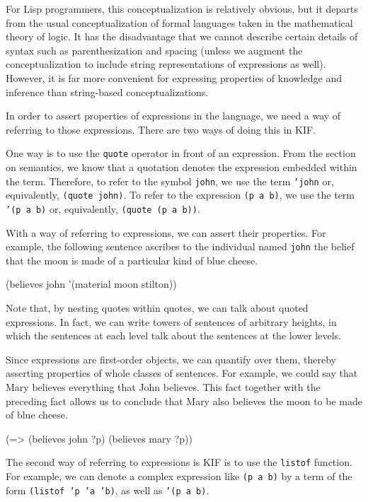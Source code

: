 For Lisp programmers, this conceptualization is relatively obvious, but it
departs from the usual conceptualization of formal languages taken in the
mathematical theory of logic.  It has the disadvantage that we cannot describe
certain details of syntax such as parenthesization and spacing (unless we
augment the conceptualization to include string representations of expressions
as well).  However, it is far more convenient for expressing properties of
knowledge and inference than string-based conceptualizations.

In order to assert properties of expressions in the language, we need a way of
referring to those expressions.  There are two ways of doing this in KIF.

One way is to use the {\tt quote} operator in front of an expression.  From the
section on semantics, we know that a quotation denotes the expression embedded
within the term.  Therefore, to refer to the symbol {\tt john}, we use the term
{\tt 'john} or, equivalently, {\tt (quote john)}.  To refer to the expression
{\tt (p a b)}, we use the term {\tt '(p a b)} or, equivalently, {\tt (quote (p a
b))}.

With a way of referring to expressions, we can assert their properties.  For
example, the following sentence ascribes to the individual named {\tt john} the
belief that the moon is made of a particular kind of blue cheese.

\medskip
\beginverbatim
(believes john '(material moon stilton))
\endverbatim
\medskip

Note that, by nesting quotes within quotes, we can talk about quoted
expressions.  In fact, we can write towers of sentences of arbitrary heights, in
which the sentences at each level talk about the sentences at the lower levels.

Since expressions are first-order objects, we can quantify over them, thereby
asserting properties of whole classes of sentences.  For example, we could say
that Mary believes everything that John believes.  This fact together with the
preceding fact allows us to conclude that Mary also believes the moon to be made
of blue cheese.

\medskip
\beginverbatim
(=> (believes john ?p) (believes mary ?p))
\endverbatim
\medskip

The second way of referring to expressions is KIF is to use the {\tt listof}
function.  For example, we can denote a complex expression like {\tt (p a b)} by
a term of the form {\tt (listof 'p 'a 'b)}, as well as {\tt '(p a b)}.

